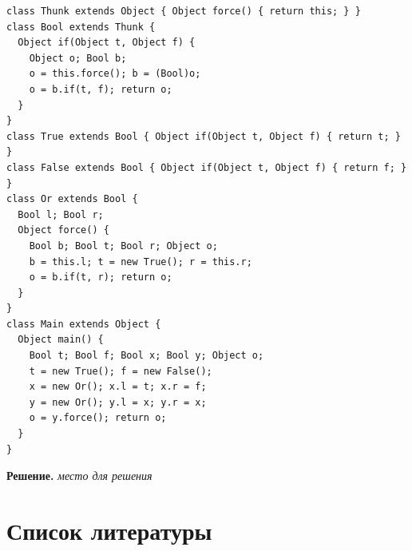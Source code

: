 \documentclass[dvipsnames]{article}
\begin{document}
\begin{enumerate}
\begin{verbatim}
class Thunk extends Object { Object force() { return this; } }
class Bool extends Thunk {
  Object if(Object t, Object f) {
    Object o; Bool b;
    o = this.force(); b = (Bool)o;
    o = b.if(t, f); return o;
  }
}
class True extends Bool { Object if(Object t, Object f) { return t; } }
class False extends Bool { Object if(Object t, Object f) { return f; } }
class Or extends Bool {
  Bool l; Bool r;
  Object force() {
    Bool b; Bool t; Bool r; Object o;
    b = this.l; t = new True(); r = this.r;
    o = b.if(t, r); return o;
  }
}
class Main extends Object {
  Object main() {
    Bool t; Bool f; Bool x; Bool y; Object o;
    t = new True(); f = new False();
    x = new Or(); x.l = t; x.r = f;
    y = new Or(); y.l = x; y.r = x;
    o = y.force(); return o;
  }
}
\end{verbatim}

  \color{blue}
  \textbf{Решение.}
  \emph{место для решения}
  \color{black}
\end{enumerate}

\section*{Список литературы}
\printbibliography[heading=none]
\end{document}
